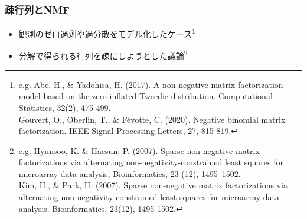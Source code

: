 \documentclass[dvipdfmx, dvipsnames]{beamer}
\begin{document}
\begin{frame}
\frametitle{疎行列とNMF}
\begin{itemize}
\item 観測のゼロ過剰や過分散をモデル化したケース\footnote{e.g. Abe, H., \& Yadohisa, H. (2017). A non-negative matrix factorization model based on the zero-inflated Tweedie distribution. Computational Statistics, 32(2), 475-499. \\ Gouvert, O., Oberlin, T., \& F\'evotte, C. (2020). Negative binomial matrix factorization. IEEE Signal Processing Letters, 27, 815-819.}
\item 分解で得られる行列を疎にしようとした議論\footnote{e.g.  Hyunsoo, K. \&  Haesun, P. (2007). Sparse non-negative matrix factorizations via alternating non-negativity-constrained least squares for microarray data analysis, Bioinformatics,  23 (12), 1495--1502. \\ Kim, H., \& Park, H. (2007). Sparse non-negative matrix factorizations via alternating non-negativity-constrained least squares for microarray data analysis. Bioinformatics, 23(12), 1495-1502.}
 \end{itemize}
 \end{frame}
\end{document}
